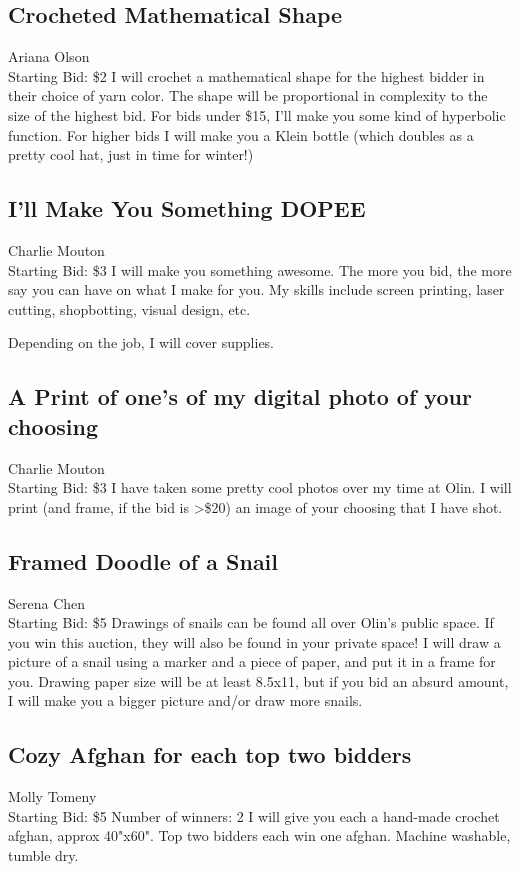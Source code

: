 \documentclass[11pt]{article}
\begin{document}
\subsection{Crocheted Mathematical Shape}
Ariana Olson
\\
Starting Bid: \$2
\newline
I will crochet a mathematical shape for the highest bidder in their choice of yarn color. The shape will be proportional in complexity to the size of the highest bid. For bids under \$15, I'll make you some kind of hyperbolic function. For higher bids I will make you  a Klein bottle (which doubles as a pretty cool hat, just in time for winter!)
\subsection{I'll Make You Something DOPEE}
Charlie Mouton
\\
Starting Bid: \$3
\newline
I will make you something awesome. The more you bid, the more say you can have on what I make for you. My skills include screen printing, laser cutting, shopbotting, visual design, etc.

Depending on the job, I will cover supplies.
\subsection{A Print of one's of my digital photo of your choosing}
Charlie Mouton
\\
Starting Bid: \$3
\newline
I have taken some pretty cool photos over my time at Olin. I will print (and frame, if the bid is \textgreater \$20) an image of your choosing that I have shot.
\subsection{Framed Doodle of a Snail}
Serena Chen
\\
Starting Bid: \$5
\newline
Drawings of snails can be found all over Olin's public space. If you win this auction, they will also be found in your private space! I will draw a picture of a snail using a marker and a piece of paper, and put it in a frame for you. Drawing paper size will be at least 8.5x11, but if you bid an absurd amount, I will make you a bigger picture and/or draw more snails.
\subsection{Cozy Afghan for each top two bidders}
Molly Tomeny
\\
Starting Bid: \$5
\newline
Number of winners: 2
\newline
I will give you each a hand-made crochet afghan, approx 40"x60". Top two bidders each win one afghan. Machine washable, tumble dry.
\end{document}
